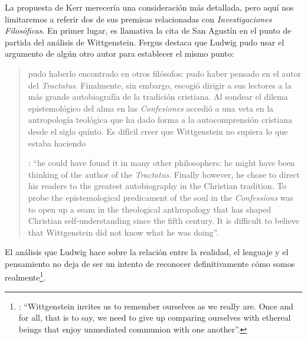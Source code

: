 La propuesta de Kerr merecería una consideración más detallada, pero aquí nos limitaremos a referir dos de sus premisas relacionadas con \emph{Investigaciones Filosóficas}. En primer lugar, es llamativa la cita de San Agustín en el punto de partida del análisis de Wittgenstein. Fergus destaca que Ludwig pudo usar el argumento de algún otro autor para establecer el mismo punto: \blockquote[{\Cite[42]{kerr1997theo}}: \enquote{he could have found it in many other philosophers: he might have been thinking of the author of the \emph{Tractatus}. Finally however, he chose to direct his readers to the greatest autobiography in the Christian tradition. To probe the epistemological predicament of the soul in the \emph{Confessions} was to open up a seam in the theological anthropology that has shaped Christian self-understanding since the fifth century. It is difficult to believe that Wittgenstein did not know what he was doing}.]{pudo haberlo encontrado en otros filósofos: pudo haber pensado en el autor del \emph{Tractatus}. Finalmente, sin embargo, escogió dirigir a sus lectores a la más grande autobiografía de la tradición cristiana. Al sondear el dilema epistemológico del alma en las \emph{Confesiones} accedió a una veta en la antropología teológica que ha dado forma a la autocomprensión cristiana desde el siglo quinto. Es difícil creer que Wittgenstein no supiera lo que estaba haciendo}. El análisis que Ludwig hace sobre la relación entre la realidad, el lenguaje y el pensamiento no deja de ser un intento de reconocer definitivamente cómo somos realmente\footnote{\cite[Cf.][23]{kerr1997theo}: \enquote{Wittgenstein invites us to remember ourselves as we really are. Once and for all, that is to say, we need to give up comparing ourselves with ethereal beings that enjoy unmediated communion with one another}.}.

